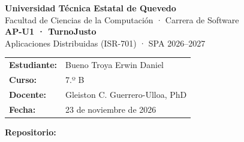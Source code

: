 \documentclass[12pt,a4paper]{article}
\begin{document}
\begin{center}
{\large\textbf{Universidad Técnica Estatal de Quevedo}}\\[2pt]
Facultad de Ciencias de la Computación · Carrera de Software\\[14pt]
{\Large\textbf{AP-U1 · TurnoJusto}}\\[4pt]
Aplicaciones Distribuidas (ISR-701) · SPA 2026--2027
\end{center}

\vspace{1cm}
\begin{tabular}{ll}
\textbf{Estudiante:} & Bueno Troya Erwin Daniel \\
\textbf{Curso:} & 7.º B \\
\textbf{Docente:} & Gleiston C. Guerrero-Ulloa, PhD \\
\textbf{Fecha:} & 23 de noviembre de 2026 \\
\end{tabular}

\vspace{1cm}
\noindent\textbf{Repositorio:}\\[4pt]
\end{document}

